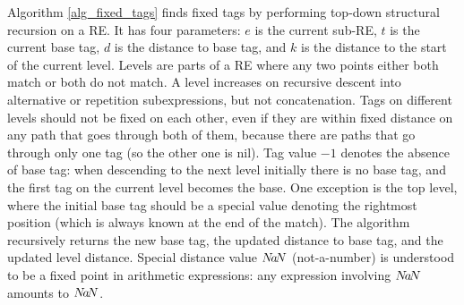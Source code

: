 \documentclass[]{article}
\begin{document}
Algorithm \ref{alg_fixed_tags} finds fixed tags by performing top-down structural recursion on a RE.
It has four parameters: $e$ is the current sub-RE, $t$ is the current base tag,
$d$ is the distance to base tag, and $k$ is the distance to the start of the current level.
Levels are parts of a RE where any two points either both match or both do not match.
A level increases on recursive descent into alternative or repetition subexpressions, but not concatenation.
Tags on different levels should not be fixed on each other, even if they are within fixed distance on any path that goes through both of them,
because there are paths that go through only one tag (so the other one is nil).
Tag value $-1$ denotes the absence of base tag: when descending to the next level initially there is no base tag, and the first tag on the current level becomes the base.
One exception is the top level, where the initial base tag should be a special value denoting the rightmost position (which is always known at the end of the match).
The algorithm recursively returns the new base tag, the updated distance to base tag, and the updated level distance.
Special distance value $N\!a\!N$ (not-a-number) is understood to be a fixed point in arithmetic expressions: any expression involving $N\!a\!N$ amounts to $N\!a\!N$.
\end{document}
